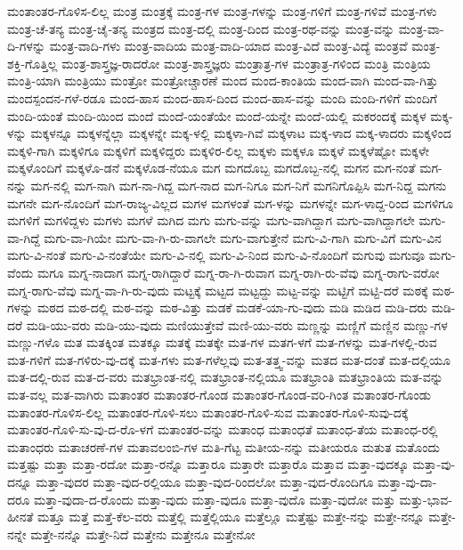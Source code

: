{ಮಂತಾಂತರ-ಗೊಳಿಸ-ಲಿಲ್ಲ
ಮಂತ್ರ
ಮಂತ್ರಕ್ಕೆ
ಮಂತ್ರ-ಗಳ
ಮಂತ್ರ-ಗಳನ್ನು
ಮಂತ್ರ-ಗಳಿಗೆ
ಮಂತ್ರ-ಗಳಿವೆ
ಮಂತ್ರ-ಗಳು
ಮಂತ್ರ-ಚೆ-ತನ್ಯ
ಮಂತ್ರ-ಚೈ-ತನ್ಯ
ಮಂತ್ರದ
ಮಂತ್ರ-ದಲ್ಲಿ
ಮಂತ್ರ-ದಿಂದ
ಮಂತ್ರ-ರಥ-ವನ್ನು
ಮಂತ್ರ-ವನ್ನು
ಮಂತ್ರ-ವಾ-ದಿ-ಗಳನ್ನು
ಮಂತ್ರ-ವಾದಿ-ಗಳು
ಮಂತ್ರ-ವಾದಿಯ
ಮಂತ್ರ-ವಾದಿ-ಯಾದ
ಮಂತ್ರ-ವಿದೆ
ಮಂತ್ರ-ವಿದ್ಯೆ
ಮಂತ್ರವೆ
ಮಂತ್ರ-ಶಕ್ತಿ-ಗೊತ್ತಿಲ್ಲ
ಮಂತ್ರ-ಶಾಸ್ತ್ರಜ್ಞ-ರಾದರೋ
ಮಂತ್ರ-ಶಾಸ್ತ್ರಜ್ಞರು
ಮಂತ್ರಾತ್ರ-ಗಳ
ಮಂತ್ರಾತ್ರ-ಗಳಿಂದ
ಮಂತ್ರಿ
ಮಂತ್ರಿಯ
ಮಂತ್ರಿ-ಯಾಗಿ
ಮಂತ್ರಿಯು
ಮಂತ್ರೋ
ಮಂತ್ರೋಚ್ಚಾರಣೆ
ಮಂದ
ಮಂದ-ಕಾಂತಿಯ
ಮಂದ-ವಾಗಿ
ಮಂದ-ವಾ-ಗಿತ್ತು
ಮಂದಸ್ಪಂದನ-ಗಳೆ-ರಡೂ
ಮಂದ-ಹಾಸ
ಮಂದ-ಹಾಸ-ದಿಂದ
ಮಂದ-ಹಾಸ-ವನ್ನು
ಮಂದಿ
ಮಂದಿ-ಗಳಿಗೆ
ಮಂದಿಗೆ
ಮಂದಿ-ಯಂತೆ
ಮಂದಿ-ಯಿಂದ
ಮಂದೆ
ಮಂದೆ-ಯಂತೆಯೇ
ಮಂದೆ-ಯನ್ನೇ
ಮಂದೆ-ಯಲ್ಲಿ
ಮಕರಂದಕ್ಕೆ
ಮಕ್ಕಳ
ಮಕ್ಕ-ಳನ್ನು
ಮಕ್ಕಳನ್ನೂ
ಮಕ್ಕಳನ್ನೆಲ್ಲಾ
ಮಕ್ಕಳನ್ನೇ
ಮಕ್ಕ-ಳಲ್ಲಿ
ಮಕ್ಕಳಾ-ಗಿವೆ
ಮಕ್ಕಳಾಟ
ಮಕ್ಕ-ಳಾದ
ಮಕ್ಕ-ಳಾದರು
ಮಕ್ಕಳಿಂದ
ಮಕ್ಕಳಿ-ಗಾಗಿ
ಮಕ್ಕಳಿಗೂ
ಮಕ್ಕಳಿಗೆ
ಮಕ್ಕಳಿದ್ದರು
ಮಕ್ಕಳಿರ-ಲಿಲ್ಲ
ಮಕ್ಕಳು
ಮಕ್ಕಳೂ
ಮಕ್ಕಳೆ
ಮಕ್ಕಳೆಷ್ಟೋ
ಮಕ್ಕಳೇ
ಮಕ್ಕಳೊಂದಿಗೆ
ಮಕ್ಕಳೊ-ಡನೆ
ಮಕ್ಕಳೊಡ-ನೆಯೂ
ಮಗ
ಮಗದೊಬ್ಬ
ಮಗದೊಬ್ಬ-ನಲ್ಲಿ
ಮಗನ
ಮಗ-ನಂತೆ
ಮಗ-ನನ್ನು
ಮಗ-ನಲ್ಲಿ
ಮಗ-ನಾಗಿ
ಮಗ-ನಾ-ಗಿದ್ದ
ಮಗ-ನಾದ
ಮಗ-ನಿಗೂ
ಮಗ-ನಿಗೆ
ಮಗನಿಗೊಪ್ಪಿಸಿ
ಮಗ-ನಿದ್ದ
ಮಗನು
ಮಗನೇ
ಮಗ-ನೊಂದಿಗೆ
ಮಗ-ರಾಜ್ಯ-ವಿಲ್ಲದ
ಮಗಳ
ಮಗಳಂತೆ
ಮಗ-ಳನ್ನು
ಮಗಳನ್ನೇ
ಮಗ-ಳಾದ್ದ-ರಿಂದ
ಮಗಳಿಗೂ
ಮಗಳಿಗೆ
ಮಗಳಿದ್ದಳು
ಮಗಳು
ಮಗಳೆ
ಮಗಿದ
ಮಗು
ಮಗು-ವನ್ನು
ಮಗು-ವಾಗಿದ್ದಾಗ
ಮಗು-ವಾಗಿದ್ದಾಗಲೇ
ಮಗು-ವಾ-ಗಿದ್ದೆ
ಮಗು-ವಾ-ಗಿಯೇ
ಮಗು-ವಾ-ಗಿ-ರು-ವಾಗಲೇ
ಮಗು-ವಾಗುತ್ತೇನೆ
ಮಗು-ವಿ-ಗಾಗಿ
ಮಗು-ವಿಗೆ
ಮಗು-ವಿನ
ಮಗು-ವಿ-ನಂತೆ
ಮಗು-ವಿ-ನಂತೆಯೇ
ಮಗು-ವಿ-ನಲ್ಲಿ
ಮಗು-ವಿ-ನಿಂದ
ಮಗು-ವಿ-ನೊಂದಿಗೆ
ಮಗುವು
ಮಗುವೂ
ಮಗು-ವೆಂದು
ಮಗೂ
ಮಗ್ನ-ನಾದಾಗ
ಮಗ್ನ-ರಾಗಿದ್ದಾರೆ
ಮಗ್ನ-ರಾ-ಗಿ-ರುವಾಗ
ಮಗ್ನ-ರಾಗಿ-ರು-ವೆವು
ಮಗ್ನ-ರಾಗು-ವರೋ
ಮಗ್ನ-ರಾಗು-ವೆವು
ಮಗ್ನ-ವಾ-ಗಿ-ರು-ವುದು
ಮಟ್ಟಕ್ಕೆ
ಮಟ್ಟದ
ಮಟ್ಟದ್ದು
ಮಟ್ಟ-ವನ್ನು
ಮಟ್ಟಿಗೆ
ಮಟ್ಟಿ-ದರೆ
ಮಠಕ್ಕೆ
ಮಠ-ಗಳನ್ನು
ಮಠದ
ಮಠ-ದಲ್ಲಿ
ಮಠ-ವನ್ನು
ಮಠ-ವಿತ್ತು
ಮಡಕೆ
ಮಡಕೆ-ಯಾ-ಗು-ವುದು
ಮಡಿ
ಮಡಿದ
ಮಡಿ-ದರು
ಮಡಿ-ದರೆ
ಮಡಿ-ಯು-ವರು
ಮಡಿ-ಯು-ವುದು
ಮಣಿಯುತ್ತೇವೆ
ಮಣಿ-ಯು-ವರು
ಮಣ್ಣನ್ನು
ಮಣ್ಣಿಗೆ
ಮಣ್ಣಿನ
ಮಣ್ಣು-ಗಳ
ಮಣ್ಣು-ಗಳೊ
ಮತ
ಮತಕ್ಕಿಂತ
ಮತಕ್ಕೂ
ಮತಕ್ಕೆ
ಮತಕ್ಕೇ
ಮತ-ಗಳ
ಮತಗ-ಳಗೆ
ಮತ-ಗಳನ್ನು
ಮತ-ಗಳಲ್ಲಿ-ರುವ
ಮತ-ಗಳಿಗೆ
ಮತ-ಗಳಿರು-ವು-ದಕ್ಕೆ
ಮತ-ಗಳು
ಮತ-ಗಳೆಲ್ಲವು
ಮತ-ತತ್ತ್ವ-ವನ್ನು
ಮತದ
ಮತ-ದಂತೆ
ಮತ-ದಲ್ಲಿಯೂ
ಮತ-ದಲ್ಲಿ-ರುವ
ಮತ-ದ-ವರು
ಮತಭ್ರಾಂತ-ನಲ್ಲಿ
ಮತಭ್ರಾಂತ-ನಲ್ಲಿಯೂ
ಮತಭ್ರಾಂತಿ
ಮತಭ್ರಾಂತಿಯ
ಮತ-ವನ್ನು
ಮತ-ವಲ್ಲ
ಮತ-ವಾಗಿರು
ಮತಾಂತರ
ಮತಾಂತರ-ಗೊಂಡ
ಮತಾಂತರ-ಗೊಂಡ-ವರಿ-ಗಿಂತ
ಮತಾಂತರ-ಗೊಂಡು
ಮತಾಂತರ-ಗೊಳಿಸ-ಲಿಲ್ಲ
ಮತಾಂತರ-ಗೊಳಿ-ಸಲು
ಮತಾಂತರ-ಗೊಳಿ-ಸುವ
ಮತಾಂತರ-ಗೊಳಿ-ಸುವು-ದಕ್ಕೆ
ಮತಾಂತರ-ಗೊಳಿ-ಸು-ವು-ದ-ರೊ-ಳಗೆ
ಮತಾಂತರ-ವನ್ನು
ಮತಾಂಧ
ಮತಾಂಧತೆ
ಮತಾಂಧ-ತೆಯ
ಮತಾಂಧ-ರಲ್ಲಿ
ಮತಾಂಧರು
ಮತಾಚರಣೆ-ಗಳ
ಮತಾವಲಂಬಿ-ಗಳ
ಮತಿ-ಗೆಟ್ಟ
ಮತೀಯ-ನನ್ನು
ಮತೀಯರೂ
ಮತುತ
ಮತೊಂದು
ಮತ್ತಷ್ಟು
ಮತ್ತಾ
ಮತ್ತಾ-ರದೋ
ಮತ್ತಾ-ರನ್ನೊ
ಮತ್ತಾರೂ
ಮತ್ತಾರೇ
ಮತ್ತಾರೊ
ಮತ್ತಾವ
ಮತ್ತಾ-ವುದಕ್ಕೂ
ಮತ್ತಾ-ವು-ದನ್ನೂ
ಮತ್ತಾ-ವುದರ
ಮತ್ತಾ-ವುದ-ರಲ್ಲಿಯೂ
ಮತ್ತಾ-ವುದ-ರಿಂದಲೋ
ಮತ್ತಾ-ವುದ-ರೊಂದಿಗೂ
ಮತ್ತಾ-ವು-ದಾ-ದರೂ
ಮತ್ತಾ-ವುದಾ-ದ-ರೊಂದು
ಮತ್ತಾ-ವುದು
ಮತ್ತಾ-ವುದೂ
ಮತ್ತಾ-ವುದೊ
ಮತ್ತಾ-ವುದೋ
ಮತ್ತು
ಮತ್ತು-ಭಾವ-ಹೀನತೆ
ಮತ್ತೂ
ಮತ್ತೆ
ಮತ್ತೆ-ಕೆಲ-ವರು
ಮತ್ತೆಲ್ಲಿ
ಮತ್ತೆಲ್ಲಿಯೂ
ಮತ್ತೆಲ್ಲೂ
ಮತ್ತೆಷ್ಟು
ಮತ್ತೇ-ನನ್ನು
ಮತ್ತೇ-ನನ್ನೂ
ಮತ್ತೇ-ನನ್ನೇ
ಮತ್ತೇ-ನನ್ನೊ
ಮತ್ತೇ-ನಿದೆ
ಮತ್ತೇನು
ಮತ್ತೇನೂ
ಮತ್ತೇನೋ
}
